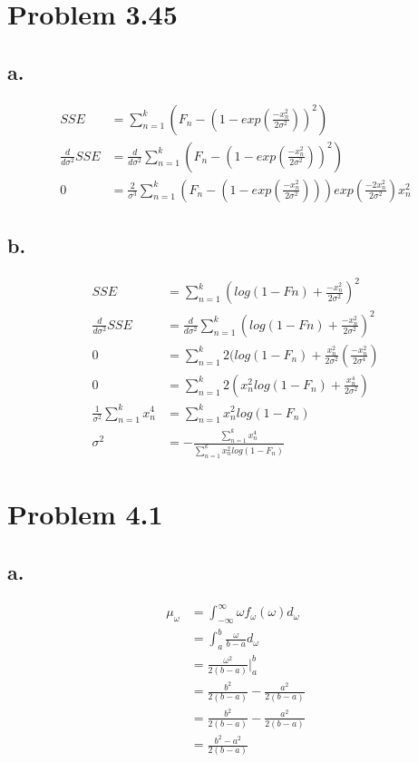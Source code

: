 \documentclass[12pt]{article}
\begin{document}
\section*{Problem 3.45}
\subsection*{a.}
\begin{align*}
  SSE &= \sum_{n=1}^k \left( F_n - (1 - exp(\frac{-x_n^2}{2\sigma^2}))^2 \right) \\
  \frac{d}{d\sigma^2}SSE &= \frac{d}{d\sigma^2}\sum_{n=1}^k \left( F_n - (1 - exp(\frac{-x_n^2}{2\sigma^2}))^2 \right) \\
  0 &= \frac{2}{\sigma^3}\sum_{n=1}^k \left( F_n - (1 - exp(\frac{-x_n^2}{2\sigma^2}))\right)exp(\frac{-2x_n^2}{2\sigma^2})x_n^2
\end{align*}

\subsection*{b.}
\begin{align*}
  SSE &= \sum_{n=1}^k \left( log(1-Fn) + \frac{-x_n^2}{2\sigma^2} \right)^2 \\
  \frac{d}{d\sigma^2}SSE &= \frac{d}{d\sigma^2} \sum_{n=1}^k \left( log(1-Fn) + \frac{-x_n^2}{2\sigma^2} \right)^2 \\
  0 &= \sum_{n=1}^k 2(log(1-F_n) + \frac{x_n^2}{2\sigma^2}(\frac{-x_n^2}{2\sigma^4}) \\
  0 &= \sum_{n=1}^k 2(x_n^2 log(1-F_n) + \frac{x_n^4}{2\sigma^2}) \\
  \frac{1}{\sigma^2} \sum_{n=1}^k x_n^4 &= \sum_{n=1}^k x_n^2 log(1-F_n) \\
  \sigma^2 &= -\frac{\sum_{n=1}^k x_n^4}{\sum_{n=1}^k x_n^2 log(1-F_n)}
\end{align*}
\section*{Problem 4.1}
\subsection*{a.}
\begin{align*}
  \mu_\omega &= \int_{-\infty}^{\infty} \omega f_\omega(\omega) d_\omega \\
   &= \int_{a}^{b} \frac{\omega}{b-a} d_\omega \\
   &= \frac{\omega^2}{2(b-a)} \big|_a^b \\
   &= \frac{b^2}{2(b-a)}-\frac{a^2}{2(b-a)} \\
   &= \frac{b^2}{2(b-a)}-\frac{a^2}{2(b-a)} \\
   &= \frac{b^2-a^2}{2(b-a)}
\end{align*}
\end{document}
